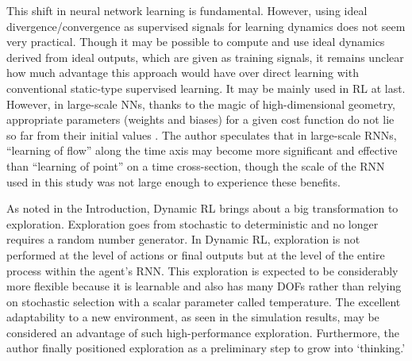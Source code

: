This shift in neural network learning is fundamental.
However, using ideal divergence/convergence as supervised signals for learning dynamics does not seem very practical.
Though it may be possible to compute and use ideal dynamics derived from ideal outputs, which are given as training signals,
it remains unclear how much advantage this approach would have over direct learning with conventional static-type supervised learning.
It may be mainly used in RL at last.
However, in large-scale NNs, thanks to the magic of high-dimensional geometry,
appropriate parameters (weights and biases) for a given cost function do not lie so far from their initial values \citep{Amari}.
The author speculates that in large-scale RNNs, ``learning of flow'' along the time axis may become more significant and effective
than ``learning of point'' on a time cross-section,
though the scale of the RNN used in this study was not large enough to experience these benefits.

As noted in the Introduction, Dynamic RL brings about a big transformation to exploration.
Exploration goes from stochastic to deterministic and no longer requires a random number generator.
In Dynamic RL, exploration is not performed at the level of actions or final outputs
but at the level of the entire process within the agent's RNN.
This exploration is expected to be considerably more flexible because it is learnable and also has many DOFs
rather than relying on stochastic selection with a scalar parameter called temperature.
The excellent adaptability to a new environment, as seen in the simulation results,
may be considered an advantage of such high-performance exploration.
Furthermore, the author finally positioned exploration as a preliminary step to grow into `thinking.'

